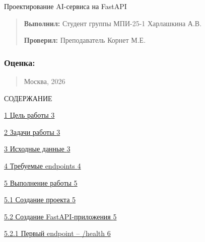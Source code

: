 \documentclass[
]{article}
\begin{document}
Проектирование AI-сервиса на FastAPI

\begin{quote}
\textbf{Выполнил:} Студент группы МПИ-25-1 Харлашкина А.В.

\textbf{Проверил:} Преподаватель Корнет М.Е.
\end{quote}

\subsubsection{\texorpdfstring{Оценка:
}{Оценка: }}\label{ux43eux446ux435ux43dux43aux430}

\begin{quote}
Москва, 2026
\end{quote}

СОДЕРЖАНИЕ

\hyperref[ux446ux435ux43bux44c-ux440ux430ux431ux43eux442ux44b]{1 Цель
работы
\hyperref[ux446ux435ux43bux44c-ux440ux430ux431ux43eux442ux44b]{3}}

\hyperref[ux437ux430ux434ux430ux447ux438-ux440ux430ux431ux43eux442ux44b]{2
Задачи работы
\hyperref[ux437ux430ux434ux430ux447ux438-ux440ux430ux431ux43eux442ux44b]{3}}

\hyperref[ux438ux441ux445ux43eux434ux43dux44bux435-ux434ux430ux43dux43dux44bux435]{3
Исходные данные
\hyperref[ux438ux441ux445ux43eux434ux43dux44bux435-ux434ux430ux43dux43dux44bux435]{3}}

\hyperref[ux442ux440ux435ux431ux443ux435ux43cux44bux435-endpoints]{4
Требуемые endpoints
\hyperref[ux442ux440ux435ux431ux443ux435ux43cux44bux435-endpoints]{4}}

\hyperref[ux432ux44bux43fux43eux43bux43dux435ux43dux438ux435-ux440ux430ux431ux43eux442ux44b]{5
Выполнение работы
\hyperref[ux432ux44bux43fux43eux43bux43dux435ux43dux438ux435-ux440ux430ux431ux43eux442ux44b]{5}}

\hyperref[ux441ux43eux437ux434ux430ux43dux438ux435-ux43fux440ux43eux435ux43aux442ux430]{5.1
Создание проекта
\hyperref[ux441ux43eux437ux434ux430ux43dux438ux435-ux43fux440ux43eux435ux43aux442ux430]{5}}

\hyperref[ux441ux43eux437ux434ux430ux43dux438ux435-fastapi-ux43fux440ux438ux43bux43eux436ux435ux43dux438ux44f]{5.2
Создание FastAPI-приложения
\hyperref[ux441ux43eux437ux434ux430ux43dux438ux435-fastapi-ux43fux440ux438ux43bux43eux436ux435ux43dux438ux44f]{5}}

\hyperref[ux43fux435ux440ux432ux44bux439-endpoint-health]{5.2.1 Первый
endpoint -- /health
\hyperref[ux43fux435ux440ux432ux44bux439-endpoint-health]{6}}
\end{document}
